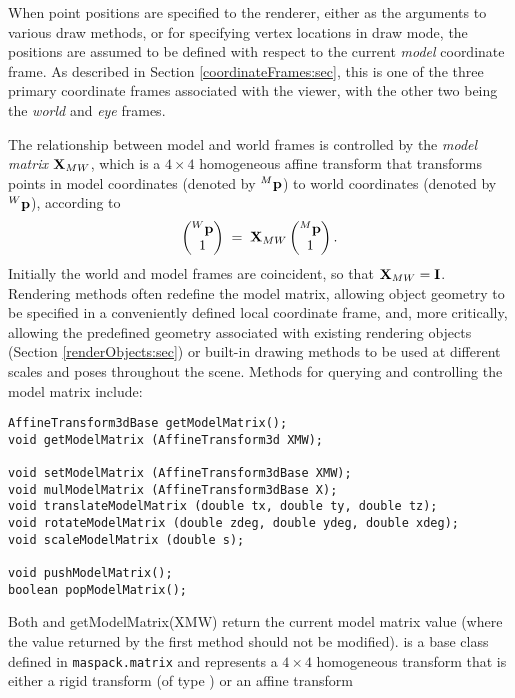 When point positions are specified to the renderer, either as the
arguments to various draw methods, or for specifying vertex
locations in draw mode, the positions are assumed to be defined with
respect to the current {\it model} coordinate frame. As described in
Section \ref{coordinateFrames:sec}, this is one of the three primary
coordinate frames associated with the viewer, with the other two
being the {\it world} and {\it eye} frames.

The relationship between model and world frames is controlled by the
{\it model matrix} ${\bf X}_{MW}$, which is a $4 \times 4$ homogeneous
affine transform that transforms points in model coordinates (denoted
by ${}^M{\bf p}$) to world coordinates (denoted by ${}^W{\bf p}$), according to
%
\begin{equation*}
\left(\begin{matrix} {}^W{\bf p} \\ 1 \end{matrix}\right) \;=\;
{\bf X}_{MW} \left(\begin{matrix} {}^M{\bf p} \\ 1 \end{matrix}\right).
\end{equation*}
%
Initially the world and model frames are coincident, so that ${\bf X}_{MW}
= {\bf I}$. Rendering methods often redefine the model matrix, allowing
object geometry to be specified in a conveniently defined local
coordinate frame, and, more critically, allowing the predefined
geometry associated with existing rendering objects (Section
\ref{renderObjects:sec}) or built-in drawing methods to be used at
different scales and poses throughout the scene.  Methods for querying
and controlling the model matrix include:
%
\begin{lstlisting}[]
AffineTransform3dBase getModelMatrix();
void getModelMatrix (AffineTransform3d XMW);

void setModelMatrix (AffineTransform3dBase XMW);
void mulModelMatrix (AffineTransform3dBase X);
void translateModelMatrix (double tx, double ty, double tz);
void rotateModelMatrix (double zdeg, double ydeg, double xdeg);
void scaleModelMatrix (double s);

void pushModelMatrix();
boolean popModelMatrix();
\end{lstlisting}
%
Both  and
%
{getModelMatrix(XMW)} return the current model matrix value (where the
value returned by the first method should not be modified).
 is a base class defined
in {\tt maspack.matrix} and represents a $4 \times 4$ homogeneous transform
that is either a rigid transform
(of type
) or an affine transform
